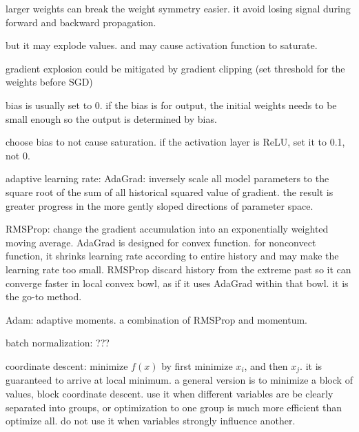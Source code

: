 larger weights can break the weight symmetry easier. it avoid losing signal during forward and backward propagation. 

but it may explode values. and may cause activation function to saturate.

gradient explosion could be mitigated by gradient clipping (set threshold for the weights before SGD)

bias is usually set to 0. if the bias is for output, the initial weights needs to be small enough so the output is determined by bias.

choose bias to not cause saturation. if the activation layer is ReLU, set it to 0.1, not 0.

adaptive learning rate:
AdaGrad: inversely scale all model parameters to the square root of the sum of all historical squared value of gradient. the result is greater progress in the more gently sloped directions of parameter space. 

RMSProp: change the gradient accumulation into an exponentially weighted moving average. AdaGrad is designed for convex function. for nonconvect function, it shrinks learning rate according to entire history and may make the learning rate too small. RMSProp discard history from the extreme past so it can converge faster in local convex bowl, as if it uses AdaGrad within that bowl. it is the go-to method.


Adam: adaptive moments. a combination of RMSProp and momentum. 

batch normalization: ???

coordinate descent: minimize $f(x)$ by first minimize $x_i$, and then $x_j$. it is guaranteed to arrive at local minimum. a general version is to minimize a block of values, block coordinate descent. use it when different variables are be clearly separated into groups, or optimization to one group is much more efficient than optimize all. do not use it when variables strongly influence another.











































